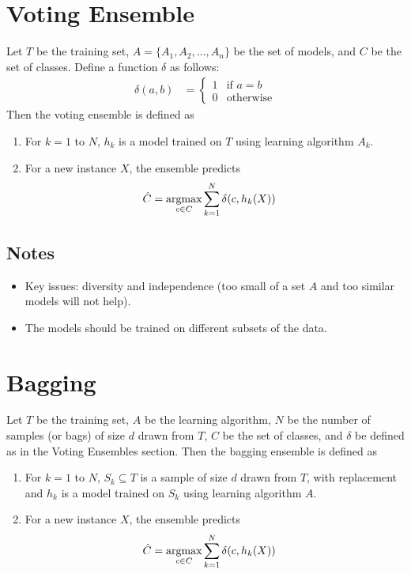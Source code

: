 \documentclass[10pt]{report}
\begin{document}
\section{Voting Ensemble}
Let $T$ be the training set, $A = \{A_1, A_2, \ldots, A_n\}$ be the set of models, and $C$ be the set of classes. Define a function $\delta$ as follows:
\begin{align*}
  \delta(a, b) &= \begin{cases}
    1 & \text{if } a = b\\
    0 & \text{otherwise}
  \end{cases}
\end{align*}
Then the voting ensemble is defined as
\begin{enumerate}
  \item For $k = 1$ to $N$, $h_k$ is a model trained on $T$ using learning algorithm $A_k$.
  \item For a new instance $X$, the ensemble predicts
    \begin{align*}
      \hat{C} &= \operatorname*{arg max}_{c \in C} \sum_{k=1}^N \delta(c, h_k(X))
    \end{align*}
\end{enumerate}
\subsection{Notes}
\begin{itemize}
  \item Key issues: diversity and independence (too small of a set $A$ and too similar models will not help).
  \item The models should be trained on different subsets of the data.
\end{itemize}
\section{Bagging}
Let $T$ be the training set, $A$ be the learning algorithm, $N$ be the number of samples (or bags) of size $d$ drawn from $T$, $C$ be the set of classes, and $\delta$ be defined as in the Voting Ensembles section. Then the bagging ensemble is defined as
\begin{enumerate}
  \item For $k = 1$ to $N$, $S_k \subseteq T$ is a sample of size $d$ drawn from $T$, with replacement and $h_k$ is a model trained on $S_k$ using learning algorithm $A$.
    \item For a new instance $X$, the ensemble predicts
      \begin{align*}
        \hat{C} &= \operatorname*{arg max}_{c \in C} \sum_{k=1}^N \delta(c, h_k(X))
      \end{align*}
\end{enumerate}
\end{document}

